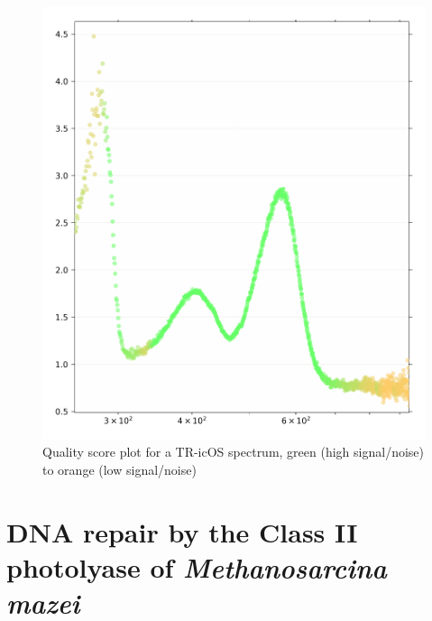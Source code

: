 \begin{figure}[H] %
    \centering
    \noindent \includegraphics[width=\textwidth]{images/Spectroscopy/quality_TR-icOS.pdf}
    \hfill
    \caption{Quality score plot for a TR-icOS spectrum, green (high signal/noise) to orange (low signal/noise)}
    \label{supfig:quality}
\end{figure}


\section{DNA repair by the Class II photolyase of \textit{Methanosarcina mazei}\label{sec:paperMmCPDII}}
